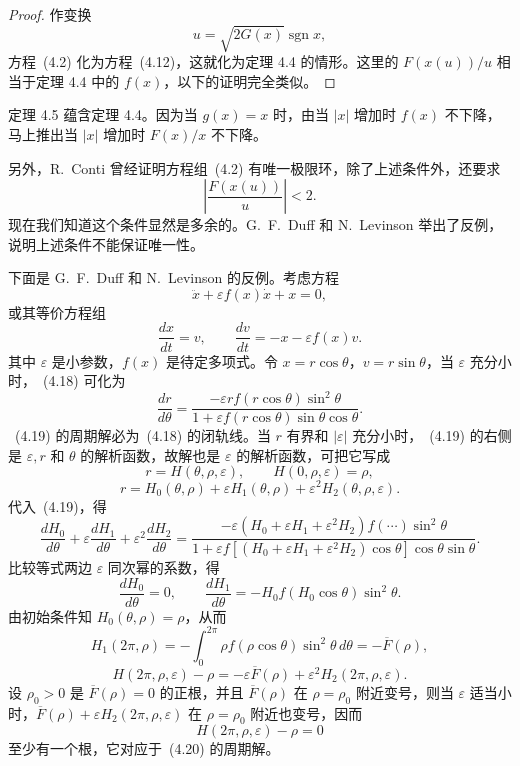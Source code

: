 \begin{proof}
作变换
\[
u=\sqrt{2G(x)}\operatorname{sgn}x,
\]
方程~(4.2) 化为方程~(4.12)，这就化为定理 4.4 的情形。这里的
$F(x(u))/u$ 相当于定理 4.4 中的 $f(x)$，以下的证明完全类似。
\end{proof}

定理 4.5 蕴含定理 4.4。因为当 $g(x)=x$ 时，由当 $|x|$ 增加时 $f(x)$ 不下降，马上推出当 $|x|$ 增加时 $F(x)/x$ 不下降。

另外，R.~Conti 曾经证明方程组~(4.2) 有唯一极限环，除了上述条件外，还要求
\[
\left|\dfrac{F(x(u))}{u}\right|<2.
\]
现在我们知道这个条件显然是多余的。G.~F.~Duff 和 N.~Levinson 举出了反例，说明上述条件不能保证唯一性。

下面是 G.~F.~Duff 和 N.~Levinson 的反例。考虑方程
\[
\ddot{x}+\varepsilon f(x)\dot{x}+x=0,
\]
或其等价方程组
\[
\dfrac{dx}{dt}=v,\qquad \dfrac{dv}{dt}=-x-\varepsilon f(x)v. \tag{4.18}
\]
其中 $\varepsilon$ 是小参数，$f(x)$ 是待定多项式。令 $x=r\cos\theta$，$v=r\sin\theta$，当 $\varepsilon$ 充分小时，~(4.18) 可化为
\[
\dfrac{dr}{d\theta}=
\dfrac{-\varepsilon r f(r\cos\theta)\sin^2\theta}
{1+\varepsilon f(r\cos\theta)\sin\theta\cos\theta}. \tag{4.19}
\]
~(4.19) 的周期解必为~(4.18) 的闭轨线。当 $r$ 有界和 $|\varepsilon|$ 充分小时，~(4.19) 的右侧是 $\varepsilon,r$ 和 $\theta$ 的解析函数，故解也是 $\varepsilon$ 的解析函数，可把它写成
\[
r=H(\theta,\rho,\varepsilon),\qquad H(0,\rho,\varepsilon)=\rho,
\]
\[
r=H_0(\theta,\rho)+\varepsilon H_1(\theta,\rho)+\varepsilon^2H_2(\theta,\rho,\varepsilon).
\]
代入~(4.19)，得
\[
\dfrac{dH_0}{d\theta}+\varepsilon\dfrac{dH_1}{d\theta}
+\varepsilon^2\dfrac{dH_2}{d\theta}
=\dfrac{-\varepsilon(H_0+\varepsilon H_1+\varepsilon^2H_2)
 f(\cdots)\sin^2\theta}
{1+\varepsilon f[(H_0+\varepsilon H_1+\varepsilon^2H_2)\cos\theta]\cos\theta\sin\theta}.
\]
比较等式两边 $\varepsilon$ 同次幂的系数，得
\[
\dfrac{dH_0}{d\theta}=0,\qquad
\dfrac{dH_1}{d\theta}=-H_0f(H_0\cos\theta)\sin^2\theta.
\]
由初始条件知 $H_0(\theta,\rho)=\rho$，从而
\[
H_1(2\pi,\rho)=-\int_0^{2\pi}\rho f(\rho\cos\theta)\sin^2\theta\,d\theta=-\overline{F}(\rho),
\]
\[
H(2\pi,\rho,\varepsilon)-\rho
=-\varepsilon\overline{F}(\rho)+\varepsilon^2H_2(2\pi,\rho,\varepsilon). \tag{4.20}
\]
设 $\rho_0>0$ 是 $\overline{F}(\rho)=0$ 的正根，并且 $\overline{F}(\rho)$ 在 $\rho=\rho_0$ 附近变号，则当 $\varepsilon$ 适当小时，$\overline{F}(\rho)+\varepsilon H_2(2\pi,\rho,\varepsilon)$ 在 $\rho=\rho_0$ 附近也变号，因而
\[
H(2\pi,\rho,\varepsilon)-\rho=0
\]
至少有一个根，它对应于~(4.20) 的周期解。

